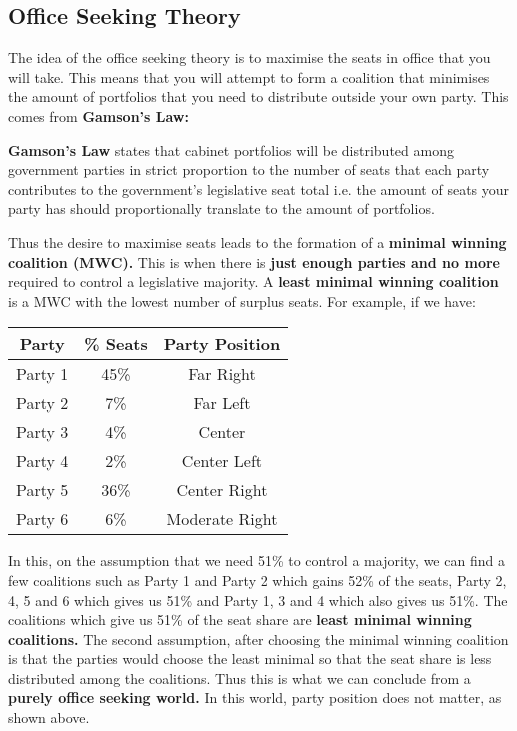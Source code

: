 \documentclass[12pt, letterpaper]{article}
\begin{document}
\subsection{Office Seeking Theory}
The idea of the office seeking theory is to maximise the seats in office that you will take. This means that you will attempt to form a coalition that minimises the amount of portfolios that you need to distribute outside your own party. This comes from \textbf{Gamson's Law:}
\begin{center}
	\textbf{Gamson's Law} states that cabinet portfolios will be distributed among government parties in strict proportion to the number of seats that each party contributes to the government's legislative seat total i.e. the amount of seats your party has should proportionally translate to the amount of portfolios.
\end{center}
Thus the desire to maximise seats leads to the formation of a \textbf{minimal winning coalition (MWC).} This is when there is \textbf{just enough parties and no more} required to control a legislative majority. A \textbf{least minimal winning coalition} is a MWC with the lowest number of surplus seats. For example, if we have:
\begin{center}
\begin{tabular}{|c|c|c|}

\hline
Party & \% Seats & Party Position\\
\hline
Party 1 & 45\% & Far Right\\
\hline
Party 2 & 7\% & Far Left\\
\hline
Party 3 & 4\% & Center\\
\hline
Party 4 & 2\% & Center Left\\
\hline
Party 5 & 36\% & Center Right\\
\hline
Party 6 & 6\% & Moderate Right\\
\hline

\end{tabular}
\end{center}

In this, on the assumption that we need 51\% to control a majority, we can find a few coalitions such as Party 1 and Party 2 which gains 52\% of the seats, Party 2, 4, 5 and 6 which gives us 51\% and Party 1, 3 and 4 which also gives us 51\%. The coalitions which give us 51\% of the seat share are \textbf{least minimal winning coalitions.} The second assumption, after choosing the minimal winning coalition is that the parties would choose the least minimal so that the seat share is less distributed among the coalitions. Thus this is what we can conclude from a \textbf{purely office seeking world.} In this world, party position does not matter, as shown above.
\end{document}
